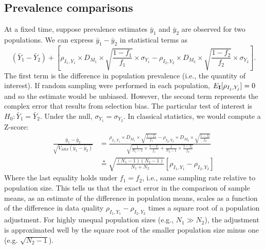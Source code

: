 \documentclass[12pt]{amsart}
\numberwithin{equation}{section}
\theoremstyle{plain}
\def\I{\bf I}
\begin{document}
\subsection{Prevalence comparisons}

At a fixed time, suppose prevalence estimates $\bar y_1$ and $\bar y_2$ are observed for two populations. We can express $\bar y_1 - \bar y_2$ in statistical terms as
$$
(\bar Y_1 - \bar Y_2) + \left[ \rho_{I_1, Y_1} \times D_{M_1} \times \sqrt{\frac{1-f_1}{f_1}} \times \sigma_{Y_1}  - \rho_{I_2, Y_2} \times D_{M_2} \times \sqrt{\frac{1-f_2}{f_2}} \times \sigma_{Y_2} \right].
$$
The first term is the difference in population prevalence (i.e., the quantity of interest).  If random sampling were performed in each population, $E_{\I} [ \rho_{I_j, Y_j}] = 0$ and so the estimate would be unbiased.  However, the second term represents the complex error that results from selection bias.
The particular test of interest is $H_0: \bar Y_1 = \bar Y_2$.  Under the null, $\sigma_{Y_1} = \sigma_{Y_2}$.  In classical statistics, we would compute a Z-score:
$$
\begin{aligned}
\frac{\bar y_1 - \bar y_2}{ \sqrt{V_{SRS} (\bar y_1 - \bar y_2)} } &=
\frac{\rho_{I_1, Y_1} \times D_{M_1} \times \sqrt{\frac{1-f_1}{f_1}}  - \rho_{I_2, Y_2} \times D_{M_2} \times \sqrt{\frac{1-f_2}{f_2}} }{ \sqrt{\frac{1}{N_1 -1} \times \frac{1-f_1}{f_1} + \frac{1}{N_2 - 1} \times \frac{1-f_2}{f_2}} }  \\
&\overset{\star}{=}
\sqrt{\frac{(N_1-1)(N_2 -1)}{N_1 + N_2}} \left[ \rho_{I_1, Y_1} - \rho_{I_2, Y_2} \right]
\end{aligned}
$$
Where the last equality holds under $f_1 = f_2$, i.e., same sampling rate relative to population size. This tells us that the exact error in the comparison of sample means, as an estimate of the difference in population means, scales as a function of the difference in data quality $\rho_{I_1, Y_1} - \rho_{I_2, Y_2}$ times a square root of a population adjustment.  For highly unequal population sizes (e.g., $N_1 \gg N_2$), the adjustment is approximated well by the square root of the smaller population size minus one (e.g. $\sqrt{N_2 -1}$).
\end{document}
